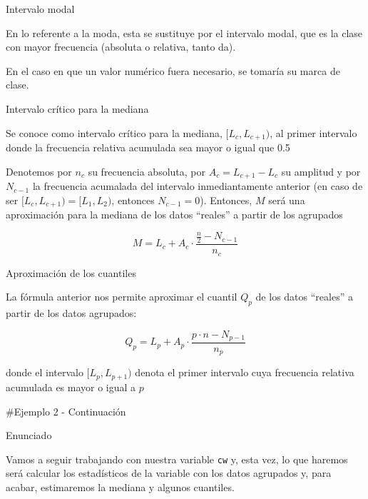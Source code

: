 \documentclass[
  ignorenonframetext,
]{beamer}
\begin{document}
\begin{frame}{Intervalo modal}
\protect\hypertarget{intervalo-modal}{}

En lo referente a la moda, esta se sustituye por el intervalo modal, que
es la clase con mayor frecuencia (absoluta o relativa, tanto da).

En el caso en que un valor numérico fuera necesario, se tomaría su marca
de clase.

\end{frame}

\begin{frame}{Intervalo crítico para la mediana}
\protect\hypertarget{intervalo-cruxedtico-para-la-mediana}{}

Se conoce como intervalo crítico para la mediana, \([L_c,L_{c+1})\), al
primer intervalo donde la frecuencia relativa acumulada sea mayor o
igual que 0.5

Denotemos por \(n_c\) su frecuencia absoluta, por \(A_c = L_{c+1}-L_c\)
su amplitud y por \(N_{c-1}\) la frecuencia acumalada del intervalo
inmediantamente anterior (en caso de ser \([L_c,L_{c+1})=[L_1,L_2)\),
entonces \(N_{c-1}=0\)). Entonces, \(M\) será una aproximación para la
mediana de los datos ``reales'' a partir de los agrupados

\[M = L_c +A_c\cdot\frac{\frac{n}{2}-N_{c-1}}{n_c}\]

\end{frame}

\begin{frame}{Aproximación de los cuantiles}
\protect\hypertarget{aproximaciuxf3n-de-los-cuantiles}{}

La fórmula anterior nos permite aproximar el cuantil \(Q_p\) de los
datos ``reales'' a partir de los datos agrupados:

\[Q_p = L_p +A_p\cdot\frac{p\cdot n-N_{p-1}}{n_p}\]

donde el intervalo \([L_p,L_{p+1})\) denota el primer intervalo cuya
frecuencia relativa acumulada es mayor o igual a \(p\)

\#Ejemplo 2 - Continuación

\end{frame}

\begin{frame}[fragile]{Enunciado}
\protect\hypertarget{enunciado-3}{}

Vamos a seguir trabajando con nuestra variable \texttt{cw} y, esta vez,
lo que haremos será calcular los estadísticos de la variable con los
datos agrupados y, para acabar, estimaremos la mediana y algunos
cuantiles.

\end{frame}
\end{document}
